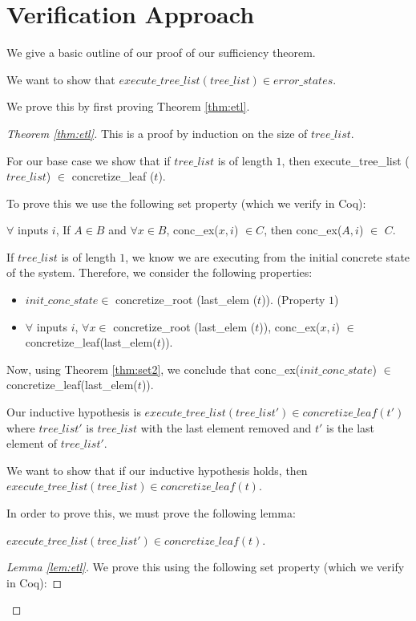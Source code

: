 \section{Verification Approach}
We give a basic outline of our proof of our sufficiency theorem.

We want to show that $execute\_tree\_list (tree\_list) \in error\_states$.

We prove this by first proving Theorem \ref{thm:etl}.

\begin{proof}[Theorem \ref{thm:etl}]
This is a proof by induction on the size of $tree\_list$.

For our base case we show that if $tree\_list$ is of length $1$, then execute\_tree\_list ($tree\_list$) $\in$ concretize\_leaf ($t$).


To prove this we use the following set property (which we verify in Coq):

\begin{theorem}
$\forall$ inputs $i$,
If $A \in B$ and 
$\forall x \in B$, conc\_ex($x, i$) $\in C$, then  conc\_ex($A, i$) $\in$ $C$.
\label{thm:set2}
\end{theorem}

If $tree\_list$ is of length $1$, we know we are executing from the initial concrete state of the system. Therefore, we consider the following properties:
\begin{itemize}
\item $init\_conc\_state \in$ 
  concretize\_root (last\_elem ($t$)). (Property $1$)
 \item $ \forall$ inputs $i$, 
 $\forall x \in$
  concretize\_root (last\_elem ($t$)),  
  conc\_ex($x, i$) $\in$ concretize\_leaf(last\_elem($t$)).
\end{itemize}

Now, using Theorem \ref{thm:set2}, we conclude that conc\_ex($init\_conc\_state$) $\in$ concretize\_leaf(last\_elem($t$)).

Our inductive hypothesis is  $execute\_tree\_list (tree\_list') \in concretize\_leaf (t')$ where $tree\_list'$ is $tree\_list$ with the last element removed and $t'$ is the last element of $tree\_list'$.

We want to show that if our inductive hypothesis holds, then $execute\_tree\_list (tree\_list) \in concretize\_leaf (t)$.

In order to prove this, we must prove the following lemma:
\begin{lemma} 
\label{lem:etl}
$execute\_tree\_list (tree\_list') \in concretize\_leaf (t)$.
\end{lemma}
\begin{proof}[Lemma \ref{lem:etl}]
We prove this using the following set property (which we verify in Coq):


\end{proof}
\end{proof}
